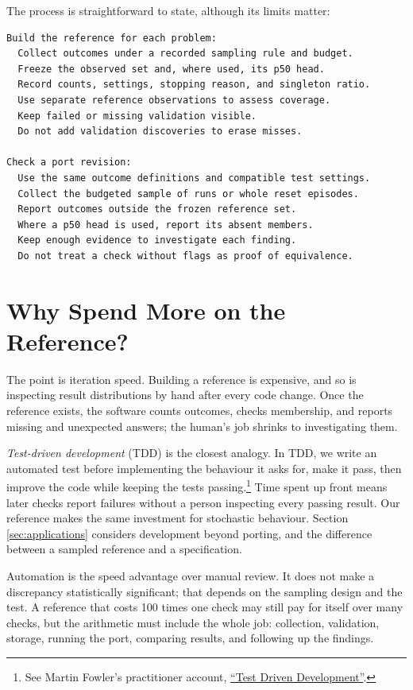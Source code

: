 \documentclass[10pt,letterpaper]{article}
\begin{document}
The process is straightforward to state, although its limits matter:

\begin{verbatim}
Build the reference for each problem:
  Collect outcomes under a recorded sampling rule and budget.
  Freeze the observed set and, where used, its p50 head.
  Record counts, settings, stopping reason, and singleton ratio.
  Use separate reference observations to assess coverage.
  Keep failed or missing validation visible.
  Do not add validation discoveries to erase misses.

Check a port revision:
  Use the same outcome definitions and compatible test settings.
  Collect the budgeted sample of runs or whole reset episodes.
  Report outcomes outside the frozen reference set.
  Where a p50 head is used, report its absent members.
  Keep enough evidence to investigate each finding.
  Do not treat a check without flags as proof of equivalence.
\end{verbatim}

\section{Why Spend More on the Reference?}\label{sec:amortization}

The point is iteration speed. Building a reference is expensive, and so is inspecting
result distributions by hand after every code change. Once the reference exists, the
software counts outcomes, checks membership, and reports missing and unexpected answers;
the human's job shrinks to investigating them.

\emph{Test-driven development} (TDD) is the closest analogy. In TDD, we write an automated
test before implementing the behaviour it asks for, make it pass, then improve the code
while keeping the tests passing.\footnote{See Martin Fowler's practitioner account,
  \href{https://martinfowler.com/bliki/TestDrivenDevelopment.html}{``Test Driven
  Development''}.} Time spent up front means later checks report failures without a person
inspecting every passing result. Our reference makes the same investment for stochastic
behaviour. Section \ref{sec:applications} considers development beyond porting, and the
difference between a sampled reference and a specification.

Automation is the speed advantage over manual review. It does not make a discrepancy
statistically significant; that depends on the sampling design and the test. A reference
that costs 100 times one check may still pay for itself over many checks, but the
arithmetic must include the whole job: collection, validation, storage, running the port,
comparing results, and following up the findings.
\end{document}
